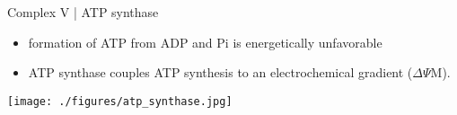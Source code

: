 \documentclass[presentation, smaller]{beamer}
\begin{document}
\begin{frame}[label={sec:orgd9b9eee}]{Complex V | ATP synthase}
\begin{itemize}
\item formation of ATP from ADP and Pi is energetically unfavorable
\item ATP synthase couples ATP synthesis to an electrochemical gradient (\(\Delta \Psi\)M).
\end{itemize}

\begin{center}
\texttt{[image: ./figures/atp\_synthase.jpg]}
\label{org2265d32}
\end{center}

\centering
{}
\end{frame}
\end{document}
